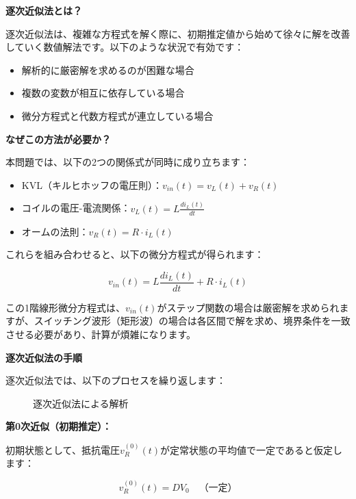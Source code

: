 \textbf{逐次近似法とは？}

逐次近似法は、複雑な方程式を解く際に、初期推定値から始めて徐々に解を改善していく数値解法です。以下のような状況で有効です：

\begin{itemize}
\item 解析的に厳密解を求めるのが困難な場合
\item 複数の変数が相互に依存している場合
\item 微分方程式と代数方程式が連立している場合
\end{itemize}

\textbf{なぜこの方法が必要か？}

本問題では、以下の2つの関係式が同時に成り立ちます：

\begin{itemize}
\item KVL（キルヒホッフの電圧則）：$v_{in}(t) = v_L(t) + v_R(t)$
\item コイルの電圧-電流関係：$v_L(t) = L \frac{di_L(t)}{dt}$
\item オームの法則：$v_R(t) = R \cdot i_L(t)$
\end{itemize}

これらを組み合わせると、以下の微分方程式が得られます：

\begin{equation}
v_{in}(t) = L \frac{di_L(t)}{dt} + R \cdot i_L(t)
\end{equation}

この1階線形微分方程式は、$v_{in}(t)$がステップ関数の場合は厳密解を求められますが、スイッチング波形（矩形波）の場合は各区間で解を求め、境界条件を一致させる必要があり、計算が煩雑になります。

\textbf{逐次近似法の手順}

逐次近似法では、以下のプロセスを繰り返します：

\begin{figure}[H]
\centering
{}
\caption{逐次近似法による解析}
\label{fig:ch04_inductor_resistor_iteration}
\end{figure}

\textbf{第0次近似（初期推定）：}

初期状態として、抵抗電圧$v_R^{(0)}(t)$が定常状態の平均値で一定であると仮定します：

\begin{equation}
v_R^{(0)}(t) = DV_0 \quad \text{（一定）}
\end{equation}

